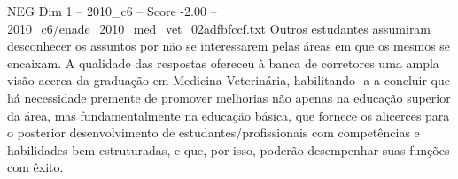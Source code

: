 \begin{textsample}{NEG Dim 1 – 2010\_c6 – Score -2.00 – 2010\_c6/enade\_2010\_med\_vet\_02adfbfccf.txt}
Outros estudantes assumiram desconhecer os assuntos por não se interessarem pelas áreas em que os mesmos se encaixam.
A qualidade das respostas ofereceu à banca de corretores uma ampla visão acerca da graduação em Medicina Veterinária, habilitando -a a concluir que há necessidade premente de promover melhorias não apenas na educação superior da área, mas fundamentalmente na educação básica, que fornece os alicerces para o posterior desenvolvimento de estudantes/profissionais com competências e habilidades bem estruturadas, e que, por isso, poderão desempenhar suas funções com êxito.

\end{textsample}
